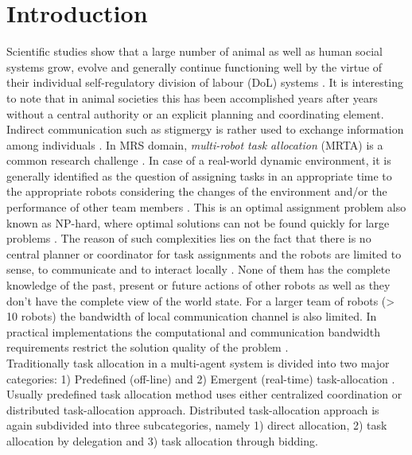 \documentclass{llncs}
\begin{document}
\section{Introduction}
\label{sec:intro}
Scientific studies show that a large number of animal as well as human social systems grow, evolve and generally continue functioning well by the virtue of their individual self-regulatory division of labour (DoL) systems \cite{Camazine+2001}. It is interesting to note that in animal societies this has been accomplished years after years without a central authority or an explicit planning and coordinating element. Indirect communication such as stigmergy is rather used to exchange information among individuals \cite{Bonabeau+1999}. 
In MRS domain, \textit{multi-robot task allocation} (MRTA) is a common research challenge \cite{Gerkey+2004}. In case of a real-world dynamic environment, it is generally identified as the question of assigning tasks in an appropriate time to the appropriate robots considering the changes of the environment and/or the performance of other team members . This is an optimal assignment problem also known as NP-hard, where optimal solutions can not be found quickly for large problems \cite{Parker2008}. The reason of such complexities lies on the fact that there is no central planner or coordinator for task assignments and the robots are limited to sense, to communicate and to interact locally \cite{Lerman+2006}. None of them has the complete knowledge of the past, present or future actions of other robots as well as they don't have the complete view of the world state. For a larger team of robots (> 10 robots) the bandwidth of local communication channel is also limited. In practical implementations the computational and communication bandwidth requirements restrict the solution quality of the problem \cite{Gerkey+2004,Lerman+2006}.\\
Traditionally task allocation in a multi-agent system is divided into two major categories: 1) Predefined (off-line) and 2) Emergent (real-time) task-allocation \cite{Shen+2001}. Usually predefined task allocation method uses either centralized coordination or distributed task-allocation approach. Distributed task-allocation approach is again subdivided into three subcategories, namely 1) direct allocation, 2) task allocation by delegation and 3) task allocation through bidding.
\end{document}
